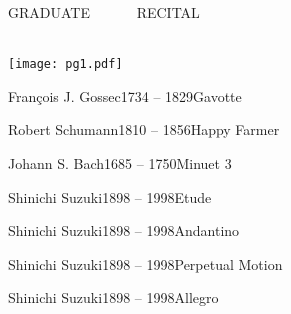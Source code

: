 \documentclass[letter,14pt]{ConcProg}
\begin{document}
\begin{programme}{
   { {\Huge{G}}{\huge{RADUATE}} ~~~~~~{\Huge{R}}{\huge{ECITAL}}}\\
   \vspace{0.4em}
       \\
}

\texttt{[image: pg1.pdf]}

\vspace{3em}

  \begin{part}[]
    \begin{composition}
    {\Large Fran\c{c}ois J. Gossec}{\normalsize{1734 -- 1829}}{\Large Gavotte}{}
    \end{composition}
\vspace{1em}    
    \begin{composition}
    {\Large Robert Schumann}{\normalsize{1810 -- 1856}}{\Large Happy Farmer}{}
    \end{composition}
\vspace{1em}     
    \begin{composition}
    {\Large Johann S. Bach}{\normalsize{1685 -- 1750}}{\Large Minuet 3}{}
    \end{composition}
\vspace{1em} 
    \begin{composition}
    {\Large Shinichi Suzuki}{\normalsize{1898 -- 1998}}{\Large Etude}{}
    \end{composition}
\vspace{1em} 
    \begin{composition}
    {\Large Shinichi Suzuki}{\normalsize{1898 -- 1998}}{\Large Andantino}{}
    \end{composition}
\vspace{1em}     
    \begin{composition}
    {\Large Shinichi Suzuki}{\normalsize{1898 -- 1998}}{\Large Perpetual Motion}{}
    \end{composition}
\vspace{1em}     
     \begin{composition}
    {\Large Shinichi Suzuki}{\normalsize{1898 -- 1998}}{\Large Allegro}{}
    \end{composition}

  \end{part}
\end{programme}
\end{document}
